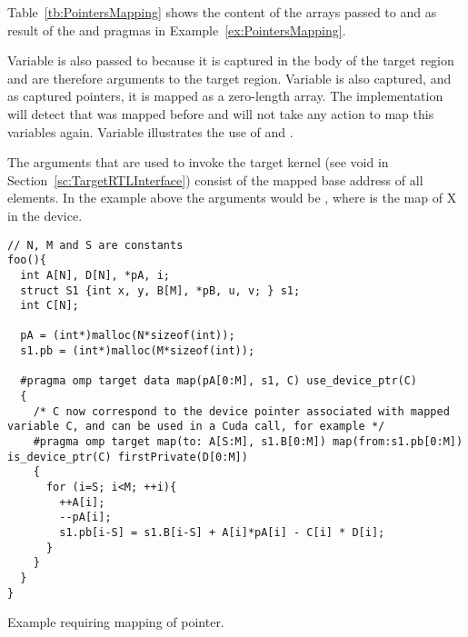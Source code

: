 Table~\ref{tb:PointersMapping} shows the content of the arrays passed to  and  as result of the \dtargetdata{} and \dtarget{} pragmas in Example~\ref{ex:PointersMapping}.

Variable  is also passed to  because it is captured in the body of the target region and are therefore arguments to the target region. Variable  is also captured, and as captured pointers, it is mapped as a zero-length array. The \libomptarget{} implementation will detect that  was mapped before and will not take any action to map this variables again. Variable  illustrates the use of  and .

The arguments that are used to invoke the target kernel (see void  in Section~\ref{sc:TargetRTLInterface}) consist of the mapped base address of all elements. In the example above the arguments would be , where  is the map of {X} in the device.

\begin{example}
\lstset{basicstyle=\scriptsize,frame=single}
\begin{lstlisting}
// N, M and S are constants
foo(){
  int A[N], D[N], *pA, i;
  struct S1 {int x, y, B[M], *pB, u, v; } s1;
  int C[N];
  
  pA = (int*)malloc(N*sizeof(int)); 
  s1.pb = (int*)malloc(M*sizeof(int)); 

  #pragma omp target data map(pA[0:M], s1, C) use_device_ptr(C)
  { 
    /* C now correspond to the device pointer associated with mapped variable C, and can be used in a Cuda call, for example */
    #pragma omp target map(to: A[S:M], s1.B[0:M]) map(from:s1.pb[0:M]) is_device_ptr(C) firstPrivate(D[0:M])
    {
      for (i=S; i<M; ++i){ 
        ++A[i]; 
        --pA[i]; 
        s1.pb[i-S] = s1.B[i-S] + A[i]*pA[i] - C[i] * D[i]; 
      }
    }
  }
}
\end{lstlisting}
\lstset{basicstyle=\small\bfseries,frame=none}
\caption{Example requiring mapping of pointer.}
\label{ex:PointersMapping}
\end{example}

